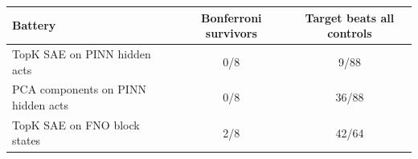 \begin{tabular}{lcc}
\toprule
Battery & Bonferroni survivors & Target beats all controls \\
\midrule
TopK SAE on PINN hidden acts & 0/8 & 9/88 \\
PCA components on PINN hidden acts & 0/8 & 36/88 \\
TopK SAE on FNO block states & 2/8 & 42/64 \\
\bottomrule
\end{tabular}
